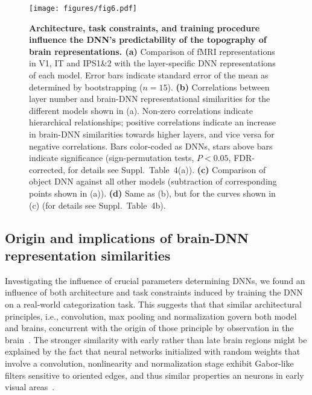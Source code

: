\documentclass[10pt,twocolumn,letterpaper]{article}
\begin{document}
\begin{figure*}[t]
\begin{center}
   \texttt{[image: figures/fig6.pdf]}
\end{center}
\vspace*{-4mm}
\caption{\textbf{Architecture, task constraints, and training procedure influence the DNN's predictability of the topography of brain representations. (a)} Comparison of fMRI representations in V1, IT and IPS1\&2 with the layer-specific DNN representations of each model. Error bars indicate standard error of the mean as determined by bootstrapping ($n = 15$). \textbf{(b)} Correlations between layer number and brain-DNN representational similarities for the different models shown in (a). Non-zero correlations indicate hierarchical relationships; positive correlations indicate an increase in brain-DNN similarities towards higher layers, and vice versa for negative correlations. Bars color-coded as DNNs, stars above bars indicate significance (sign-permutation tests, $P < 0.05$, FDR-corrected, for details see Suppl.~Table~4(a)). \textbf{(c)} Comparison of object DNN against all other models (subtraction of corresponding points shown in (a)). \textbf{(d)} Same as (b), but for the curves shown in (c) (for details see Suppl.~Table~4b).}
\label{fig:fig6}
\end{figure*}

\subsection{Origin and implications of brain-DNN representation similarities}
Investigating the influence of crucial parameters determining DNNs, we found an influence of both architecture and task constraints induced by training the DNN on a real-world categorization task. This suggests that that similar architectural principles, i.e., convolution, max pooling and normalization govern both model and brains, concurrent with the origin of those principle by observation in the brain~\cite{riesenhuber1999hierarchical}. The stronger similarity with early rather than late brain regions might be explained by the fact that neural networks initialized with random weights that involve a convolution, nonlinearity and normalization stage exhibit Gabor-like filters sensitive to oriented edges, and thus similar properties an neurons in early visual areas~\cite{saxe2011random}.
\end{document}
